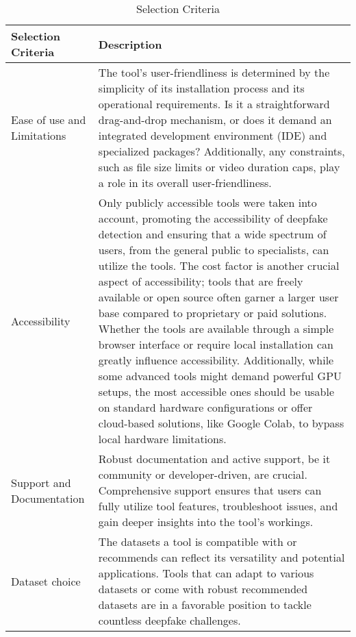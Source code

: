 \begin{table}[htpb]
	\caption{Selection Criteria}\label{tab:selection_criteria}
	\centering
	\small
	\begin{tabularx}{\textwidth}{l X}
		\toprule
		\textbf{Selection Criteria} & \textbf{Description}                       \\
		\midrule
		Ease of use and Limitations & The tool's user-friendliness is determined
		by the simplicity of its installation process and its operational
		requirements. Is it a straightforward drag-and-drop mechanism, or does
		it demand an integrated development environment (\ac{IDE}) and
		specialized packages? Additionally, any constraints, such
		as file size limits or video duration caps, play a role in its overall
		user-friendliness.                                                       \\
		\addlinespace[0.7ex]
		Accessibility               & Only publicly accessible tools were taken
		into account, promoting the accessibility of deepfake detection and
		ensuring that a wide spectrum of users, from the general public to
		specialists, can utilize the tools. The cost factor is another crucial
		aspect of accessibility; tools that are freely available or open
		source often garner a larger user base compared to proprietary or paid
		solutions. Whether the tools are available through a simple browser
		interface or require local installation can greatly influence
		accessibility. Additionally, while some advanced tools might demand
		powerful GPU setups, the most accessible ones should be usable on
		standard hardware configurations or offer cloud-based solutions, like
		Google Colab, to bypass local hardware limitations.                      \\
		\addlinespace[0.7ex]
		Support and Documentation   & Robust documentation and active support,
		be it community or developer-driven, are crucial. Comprehensive support
		ensures that users can fully utilize tool features, troubleshoot issues,
		and gain deeper insights into the tool's workings.                       \\
		\addlinespace[0.7ex]
		Dataset choice              & The datasets a tool is compatible with or
		recommends can reflect its versatility and potential applications.
		Tools that can adapt to various datasets or come with robust recommended
		datasets are in a favorable position to tackle countless deepfake
		challenges.                                                              \\
		\bottomrule
	\end{tabularx}
\end{table}

